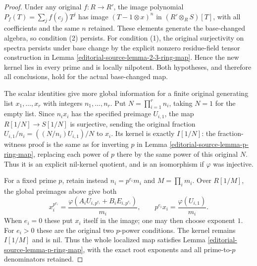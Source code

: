 \begin{proof}
Under any original $f:R\to R'$,
the image polynomial
$P_f(T)=\sum_j f(c_j)T^j$ has
image $(T-1\otimes x)^n$ in
$(R'\otimes_R S)[T]$, with all
coefficients and the same $n$
retained. These elements generate
the base-changed algebra, so
condition (2) persists. For
condition (1), the original
surjectivity on spectra persists
under base change by the explicit
nonzero residue-field tensor
construction in Lemma
\ref{editorial-source-lemma-2-3-ring-map}. Hence
the new kernel lies in every
prime and is locally nilpotent.
Both hypotheses, and therefore
all conclusions, hold for the
actual base-changed map.

The scalar identities give more
global information for a finite
original generating list
$x_1,\ldots,x_r$ with integers
$n_1,\ldots,n_r$. Put
$N=\prod_{i=1}^r n_i$, taking
$N=1$ for the empty list.
Since $n_i x_i$ has the
specified preimage $U_{i,1}$,
the map $R[1/N]\to S[1/N]$
is surjective, sending the
original fraction
$U_{i,1}/n_i=((N/n_i)U_{i,1})/N$
to $x_i$. Its kernel is exactly
$I[1/N]$: the fraction-witness
proof is the same as for
inverting $p$ in Lemma
\ref{editorial-source-lemma-p-ring-map}, replacing
each power of $p$ there by the
same power of this original $N$.
Thus it is an explicit nil-kernel
quotient, and is an isomorphism
if $\varphi$ was injective.

For a fixed prime $p$, retain
instead $n_i=p^{e_i}m_i$ and
$M=\prod_i m_i$. Over $R[1/M]$,
the global preimages above give
both
$$
x_i^{p^{e_i}}=
\frac{\varphi(A_iU_{i,p^{e_i}}+B_iE_{i,p^{e_i}})}{m_i},
\qquad
p^{e_i}x_i=\frac{\varphi(U_{i,1})}{m_i}.
$$
When $e_i=0$ these put $x_i$
itself in the image; one may
then choose exponent $1$.
For $e_i>0$ these are the
original two $p$-power conditions.
The kernel remains $I[1/M]$
and is nil. Thus the whole
localized map satisfies Lemma
\ref{editorial-source-lemma-p-ring-map}, with the
exact root exponents and all
prime-to-$p$ denominators retained.
\end{proof}